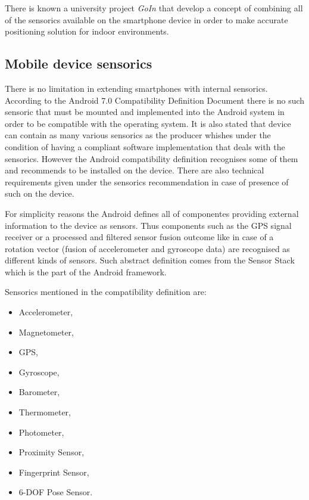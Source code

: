 \documentclass[../main.tex]{subfiles}
\begin{document}
There is known a university project \textit{GoIn} \cite{article_smartphone_features_for_indoor_positioning} that develop a concept of combining all of the sensorics available on the smartphone device in order to make accurate positioning solution for indoor environments.


\subsection{Mobile device sensorics}

There is no limitation in extending smartphones with internal sensorics. According to the Android 7.0 Compatibility Definition Document\cite{android7.0_cdd} there is no such sensoric that must be mounted and implemented into the Android system in order to be compatible with the operating system. It is also stated that device can contain as many various sensorics as the producer whishes under the condition of having a compliant software implementation that deals with the sensorics. However the Android compatibility definition recognises some of them and recommends to be installed on the device. There are also technical requirements given under the sensorics recommendation in case of presence of such on the device.

For simplicity reasons the Android defines all of componentes providing external information to the device as sensors. Thus components such as the GPS signal receiver or a processed and filtered sensor fusion outcome like in case of a rotation vector (fusion of accelerometer and gyroscope data) are recognised as different kinds of sensors. Such abstract definition comes from the Sensor Stack which is the part of the Android framework.

Sensorics mentioned in the compatibility definition are:
\begin{itemize}
 	\item Accelerometer,
	\item Magnetometer,
	\item GPS,
	\item Gyroscope,
	\item Barometer,
	\item Thermometer,
	\item Photometer,
	\item Proximity Sensor,
	\item Fingerprint Sensor,
	\item 6-DOF Pose Sensor.
 \end{itemize}
\end{document}
